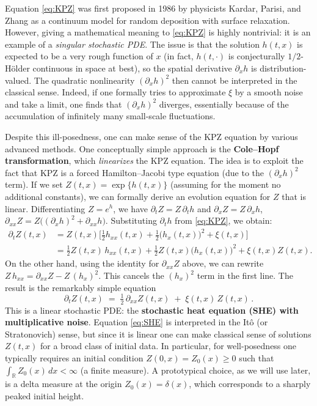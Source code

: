 \documentclass[letterpaper,11pt,oneside,reqno]{article}
\numberwithin{equation}{section}
\theoremstyle{definition}
\begin{document}
Equation \eqref{eq:KPZ} was first proposed in 1986 by physicists Kardar, Parisi, and Zhang as a continuum model for random deposition with surface relaxation. However, giving a mathematical meaning to \eqref{eq:KPZ} is highly nontrivial: it is an example of a \emph{singular stochastic PDE}. The issue is that the solution $h(t,x)$ is expected to be a very rough function of $x$ (in fact, $h(t,\cdot)$ is conjecturally $1/2$-Hölder continuous in space at best), so the spatial derivative $\partial_x h$ is distribution-valued. The quadratic nonlinearity $(\partial_x h)^2$ then cannot be interpreted in the classical sense. Indeed, if one formally tries to approximate $\xi$ by a smooth noise and take a limit, one finds that $(\partial_x h)^2$ diverges, essentially because of the accumulation of infinitely many small-scale fluctuations.

Despite this ill-posedness, one can make sense of the KPZ equation by various advanced methods. One conceptually simple approach is the \textbf{Cole--Hopf transformation}, which \emph{linearizes} the KPZ equation. The idea is to exploit the fact that KPZ is a forced Hamilton–Jacobi type equation (due to the $(\partial_x h)^2$ term). If we set $Z(t,x) = \exp\!\{h(t,x)\}$ (assuming for the moment no additional constants), we can formally derive an evolution equation for $Z$ that is linear. Differentiating $Z = e^h$, we have $\partial_t Z = Z\,\partial_t h$ and $\partial_x Z = Z\,\partial_x h$, $\partial_{xx}Z = Z\big((\partial_x h)^2 + \partial_{xx}h\big)$. Substituting $\partial_t h$ from \eqref{eq:KPZ}, we obtain:
\begin{align*}
\partial_t Z(t,x) &= Z(t,x)\Big[\tfrac{1}{2}h_{xx}(t,x) + \tfrac{1}{2}\big(h_x(t,x)\big)^2 + \xi(t,x)\Big] \\
&= \tfrac{1}{2}Z(t,x)\,h_{xx}(t,x) + \tfrac{1}{2}Z(t,x)\big(h_x(t,x)\big)^2 + \xi(t,x)Z(t,x).
\end{align*}
On the other hand, using the identity for $\partial_{xx}Z$ above, we can rewrite $Z\,h_{xx} = \partial_{xx}Z - Z\,(h_x)^2$. This cancels the $(h_x)^2$ term in the first line. The result is the remarkably simple equation
\begin{equation}\label{eq:SHE}
\partial_t Z(t,x) \;=\; \tfrac{1}{2}\,\partial_{xx}Z(t,x)\;+\; \xi(t,x)\,Z(t,x)\,.
\end{equation}
This is a linear stochastic PDE: the \textbf{stochastic heat equation (SHE) with multiplicative noise}. Equation \eqref{eq:SHE} is interpreted in the Itô (or Stratonovich) sense, but since it is linear one can make classical sense of solutions $Z(t,x)$ for a broad class of initial data. In particular, for well-posedness one typically requires an initial condition $Z(0,x)=Z_0(x)\ge0$ such that $\int_{\mathbb{R}} Z_0(x)\,dx < \infty$ (a finite measure). A prototypical choice, as we will use later, is a delta measure at the origin $Z_0(x) = \delta(x)$, which corresponds to a sharply peaked initial height.
\end{document}
